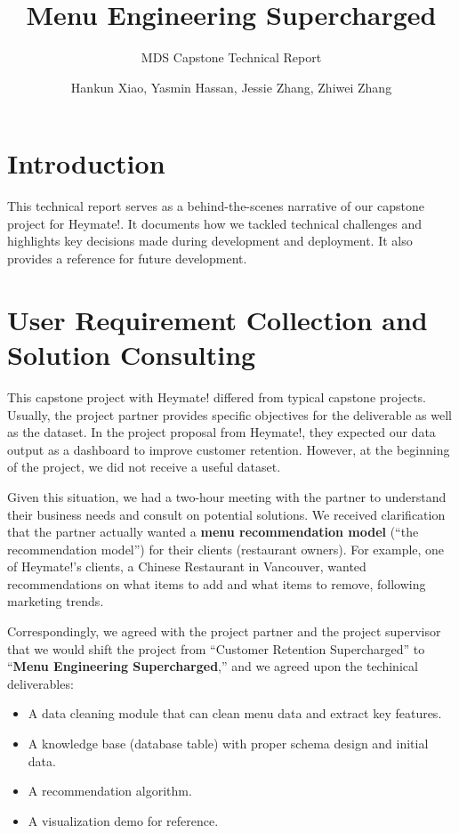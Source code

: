 \documentclass[
  11pt,
  a4paper,
  DIV=11,
  numbers=noendperiod]{scrartcl}
\title{Menu Engineering Supercharged}
\subtitle{MDS Capstone Technical Report}
\author{Hankun Xiao, Yasmin Hassan, Jessie Zhang, Zhiwei Zhang}
\date{}
\providecommand{\tightlist}{%
  \setlength{\itemsep}{0pt}\setlength{\parskip}{0pt}}\usepackage{longtable,booktabs,array}
\renewcommand*\contentsname{Table of contents}
\newcommand\contentsname{Table of contents}
\begin{document}
\maketitle

\renewcommand*\contentsname{Table of contents}
{
\hypersetup{linkcolor=}
\setcounter{tocdepth}{2}
\tableofcontents
}

\section{Introduction}\label{introduction}

This technical report serves as a behind-the-scenes narrative of our
capstone project for Heymate!. It documents how we tackled technical
challenges and highlights key decisions made during development and
deployment. It also provides a reference for future development.

\section{User Requirement Collection and Solution
Consulting}\label{user-requirement-collection-and-solution-consulting}

This capstone project with Heymate! differed from typical capstone
projects. Usually, the project partner provides specific objectives for
the deliverable as well as the dataset. In the project proposal from
Heymate!, they expected our data output as a dashboard to improve
customer retention. However, at the beginning of the project, we did not
receive a useful dataset.

Given this situation, we had a two-hour meeting with the partner to
understand their business needs and consult on potential solutions. We
received clarification that the partner actually wanted a \textbf{menu
recommendation model} (``the recommendation model'') for their clients
(restaurant owners). For example, one of Heymate!'s clients, a Chinese
Restaurant in Vancouver, wanted recommendations on what items to add and
what items to remove, following marketing trends.

Correspondingly, we agreed with the project partner and the project
supervisor that we would shift the project from ``Customer Retention
Supercharged'' to ``\textbf{Menu Engineering Supercharged},'' and we
agreed upon the techinical deliverables:

\begin{itemize}
\tightlist
\item
  A data cleaning module that can clean menu data and extract key
  features.
\item
  A knowledge base (database table) with proper schema design and
  initial data.
\item
  A recommendation algorithm.
\item
  A visualization demo for reference.
\end{itemize}
\end{document}
